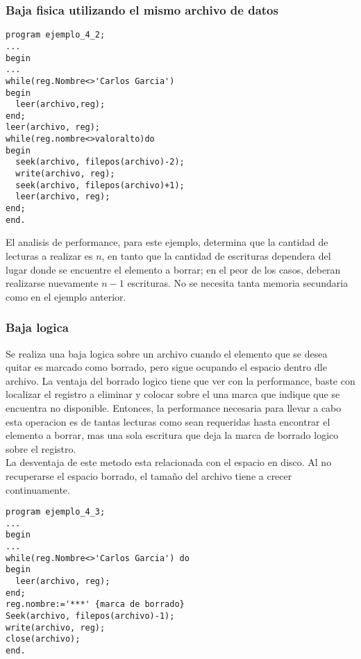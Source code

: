 \subsubsection{Baja fisica utilizando el mismo archivo de datos}
\begin{lstlisting}
program ejemplo_4_2;
...
begin
...
while(reg.Nombre<>'Carlos Garcia')
begin
  leer(archivo,reg);
end;
leer(archivo, reg);
while(reg.nombre<>valoralto)do
begin
  seek(archivo, filepos(archivo)-2);
  write(archivo, reg);
  seek(archivo, filepos(archivo)+1);
  leer(archivo, reg);
end;
end.
\end{lstlisting}

El analisis de performance, para este ejemplo, determina que la cantidad de lecturas a realizar es $n$, en tanto que la cantidad de escrituras dependera del lugar donde se encuentre el elemento a borrar; en el peor de los casos, deberan realizarse nuevamente $n-1$ escrituras. No se necesita tanta memoria secundaria como en el ejemplo anterior.

\subsubsection{Baja logica}
Se realiza una baja logica sobre un archivo cuando el elemento que se desea quitar es marcado como borrado, pero sigue ocupando el espacio dentro dle archivo. La ventaja del borrado logico tiene que ver con la performance, baste con localizar el registro a eliminar y colocar sobre el una marca que indique que se encuentra no disponible. Entonces, la performance necesaria para llevar a cabo esta operacion es de tantas lecturas como sean requeridas hasta encontrar el elemento a borrar, mas una sola escritura que deja la marca de borrado logico sobre el registro.\\
La desventaja de este metodo esta relacionada con el espacio en disco. Al no recuperarse el espacio borrado, el tamaño del archivo tiene a crecer continuamente.

\begin{lstlisting}
program ejemplo_4_3;
...
begin
...
while(reg.Nombre<>'Carlos Garcia') do
begin
  leer(archivo, reg);
end;
reg.nombre:='***' {marca de borrado}
Seek(archivo, filepos(archivo)-1);
write(archivo, reg);
close(archivo);
end.
\end{lstlisting}

